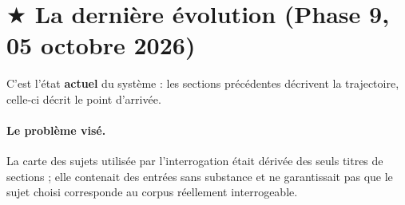 \documentclass[a4paper,12pt]{report}
\begin{document}
\section{\textcolor{genlast}{$\bigstar$ La dernière évolution (Phase 9, 05 octobre 2026)}}
C'est l'état \textbf{actuel} du système : les sections précédentes décrivent la trajectoire,
celle-ci décrit le point d'arrivée.

\paragraph{Le problème visé.} La carte des sujets utilisée par l'interrogation était dérivée des
seuls titres de sections ; elle contenait des entrées sans substance et ne garantissait pas que le
sujet choisi corresponde au corpus réellement interrogeable.
\end{document}
